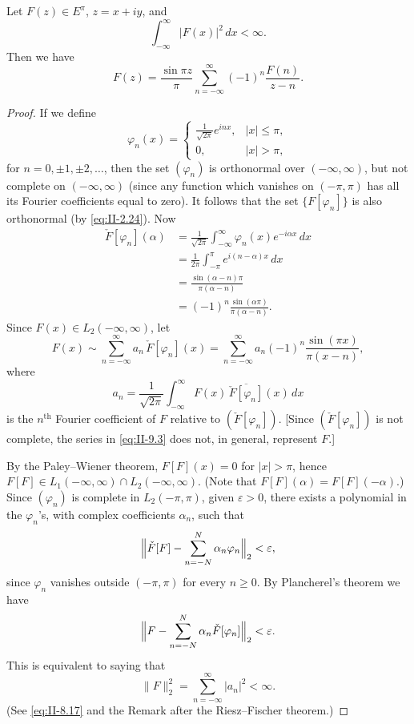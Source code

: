 \begin{theorem}[Hardy]\label{thm:II-11}
Let $F(z)\in E^{\pi}$, $z=x+iy$, and
\begin{equation}\tag{9.1}\label{eq:II-9.1}
\int_{-\infty}^{\infty}|F(x)|^{2}\,dx<\infty.
\end{equation}
Then we have
\begin{equation}\tag{9.2}\label{eq:II-9.2}
F(z)=\frac{\sin\pi z}{\pi}\sum_{n=-\infty}^{\infty}(-1)^{n}\frac{F(n)}{z-n}.
\end{equation}
\end{theorem}
\begin{proof}
If we define
\[
\varphi_{n}(x)=
\begin{cases}
\frac{1}{\sqrt{2\pi}}e^{inx}, & |x|\le\pi,\\
0, & |x|>\pi,
\end{cases}
\]
for $n=0,\pm1,\pm2,\dots$, then the set $(\varphi_{n})$ is orthonormal over $(-\infty,\infty)$, but not complete on $(-\infty,\infty)$ (since any function which vanishes on $(-\pi,\pi)$ has all its Fourier coefficients equal to zero). It follows that the set $\{F[\varphi_{n}]\}$ is also orthonormal (by \eqref{eq:II-2.24}). Now
\[
\begin{aligned}
\check F[\varphi_{n}](\alpha) &= \frac{1}{\sqrt{2\pi}}\int_{-\infty}^{\infty}\varphi_{n}(x)e^{-i\alpha x}\,dx\\
&= \frac{1}{2\pi}\int_{-\pi}^{\pi}e^{i(n-\alpha)x}\,dx\\
&= \frac{\sin(\alpha-n)\pi}{\pi(\alpha-n)}\\
&= (-1)^{n}\frac{\sin(\alpha\pi)}{\pi(\alpha-n)}.
\end{aligned}
\]
Since $F(x)\in L_{2}(-\infty,\infty)$, let
\begin{equation}\tag{9.3}\label{eq:II-9.3}
F(x)\sim\sum_{n=-\infty}^{\infty}a_{n}\,\check F[\varphi_{n}](x)
=\sum_{n=-\infty}^{\infty}a_{n}(-1)^{n}\frac{\sin(\pi x)}{\pi(x-n)},
\end{equation}
where
\[
a_{n}=\frac{1}{\sqrt{2\pi}}\int_{-\infty}^{\infty}F(x)\,\overline{\check F[\varphi_{n}]}(x)\,dx
\]
is the $n^{\text{th}}$ Fourier coefficient of $F$ relative to $(\check F[\varphi_{n}])$. [Since $(\check F[\varphi_{n}])$ is not complete, the series in \eqref{eq:II-9.3} does not, in general, represent $F$.]

By the Paley--Wiener theorem, $F[F](x)=0$ for $|x|>\pi$, hence $F[F]\in L_{1}(-\infty,\infty)\cap L_{2}(-\infty,\infty)$. (Note that $F[F](\alpha)=F[F](-\alpha)$.) Since $(\varphi_{n})$ is complete in $L_{2}(-\pi,\pi)$, given $\varepsilon>0$, there exists a polynomial in the $\varphi_{n}$'s, with complex coefficients $\alpha_{n}$, such that
\[
\Bigl\|\check F[F]-\sum_{n=-N}^{N}\alpha_{n}\varphi_{n}\Bigr\|_{2}<\varepsilon,
\]
since $\varphi_{n}$ vanishes outside $(-\pi,\pi)$ for every $n\ge 0$. By Plancherel's theorem we have
\[
\Bigl\|F-\sum_{n=-N}^{N}\alpha_{n}\check F[\varphi_{n}]\Bigr\|_{2}<\varepsilon.
\]
This is equivalent to saying that
\begin{equation}\tag{9.4}\label{eq:II-9.4}
\|F\|_{2}^{2}=\sum_{n=-\infty}^{\infty}|a_{n}|^{2}<\infty.
\end{equation}
(See \eqref{eq:II-8.17} and the Remark after the Riesz--Fischer theorem.)


\end{proof}
